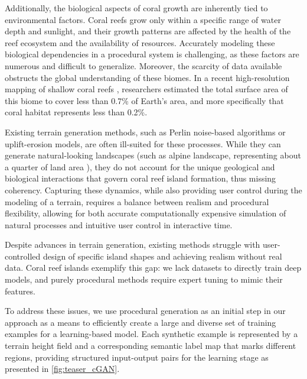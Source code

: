 \documentclass{egpubl}
\begin{document}
Additionally, the biological aspects of coral growth are inherently tied to environmental factors. Coral reefs grow only within a specific range of water depth and sunlight, and their growth patterns are affected by the health of the reef ecosystem and the availability of resources. Accurately modeling these biological dependencies in a procedural system is challenging, as these factors are numerous and difficult to generalize. Moreover, the scarcity of data available obstructs the global understanding of these biomes. In a recent high-resolution mapping of shallow coral reefs \cite{Lyons2024}, researchers estimated the total surface area of this biome to cover less than 0.7\% of Earth's area, and more specifically that coral habitat represents less than 0.2\%.

Existing terrain generation methods, such as Perlin noise-based algorithms or uplift-erosion models, are often ill-suited for these processes. While they can generate natural-looking landscapes (such as alpine landscape, representing about a quarter of land area \cite{Korner2014}), they do not account for the unique geological and biological interactions that govern coral reef island formation, thus missing coherency. Capturing these dynamics, while also providing user control during the modeling of a terrain, requires a balance between realism and procedural flexibility, allowing for both accurate computationally expensive simulation of natural processes and intuitive user control in interactive time.


Despite advances in terrain generation, existing methods struggle with user-controlled design of specific island shapes and achieving realism without real data. Coral reef islands exemplify this gap: we lack datasets to directly train deep models, and purely procedural methods require expert tuning to mimic their features.

To address these issues, we use procedural generation as an initial step in our approach as a means to efficiently create a large and diverse set of training examples for a learning-based model. Each synthetic example is represented by a terrain height field and a corresponding semantic label map that marks different regions, providing structured input-output pairs for the learning stage as presented in \cref{fig:teaser_cGAN}.
\end{document}
